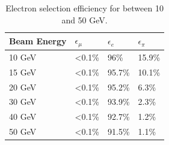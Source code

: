\begin{table}[htb!]
	\centering
	\caption{Electron selection efficiency for between 10 and 50 GeV.}
	\label{table:eff_electron}
	\begin{tabular}{@{} llll @{}}
		\hline
		\textbf{Beam Energy} & \textbf{$\epsilon_{\mu}$} & \textbf{$\epsilon_{e}$} & \textbf{$\epsilon_{\pi}$}\\
		\hline
		10 GeV & <0.1\% & 96\% & 15.9\%\\
		15 GeV & <0.1\% & 95.7\% & 10.1\%\\
		20 GeV & <0.1\% & 95.2\% & 6.3\%\\
		30 GeV & <0.1\% & 93.9\% & 2.3\%\\
		40 GeV & <0.1\% & 92.7\% & 1.2\%\\
		50 GeV & <0.1\% & 91.5\% & 1.1\%\\
		\hline
	\end{tabular}
\end{table}

